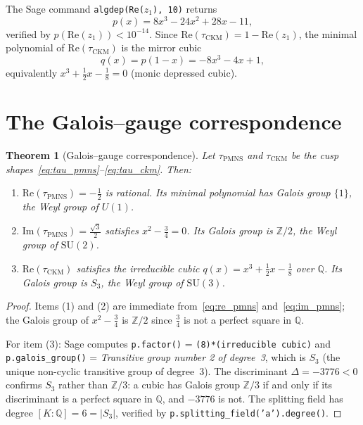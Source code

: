 \documentclass[11pt,a4paper]{article}
\newtheorem{theorem}{Theorem}
\theoremstyle{definition}
\theoremstyle{remark}
\begin{document}
The Sage command \texttt{algdep(Re($z_1$), 10)} returns
\begin{equation}
p(x) = 8x^3-24x^2+28x-11,
\label{eq:cubic}
\end{equation}
verified by $p(\mathrm{Re}(z_1))<10^{-14}$.
Since $\mathrm{Re}(\tau_{\mathrm{CKM}})=1-\mathrm{Re}(z_1)$,
the minimal polynomial of $\mathrm{Re}(\tau_{\mathrm{CKM}})$ is
the mirror cubic
\begin{equation}
q(x) = p(1-x) = -8x^3-4x+1,
\label{eq:mirror}
\end{equation}
equivalently $x^3+\tfrac12 x-\tfrac18=0$ (monic depressed cubic).

\section{The Galois--gauge correspondence}
\label{sec:galois}

\begin{theorem}[Galois--gauge correspondence]
\label{thm:main}
Let $\tau_{\mathrm{PMNS}}$ and $\tau_{\mathrm{CKM}}$ be the cusp
shapes~\eqref{eq:tau_pmns}--\eqref{eq:tau_ckm}.
Then:
\begin{enumerate}
\item $\mathrm{Re}(\tau_{\mathrm{PMNS}})=-\tfrac12$ is rational.
  Its minimal polynomial has Galois group $\{1\}$,
  the Weyl group of $U(1)$.
\item $\mathrm{Im}(\tau_{\mathrm{PMNS}})=\tfrac{\sqrt3}{2}$ satisfies
  $x^2-\tfrac34=0$.
  Its Galois group is $\mathbb{Z}/2$,
  the Weyl group of $\mathrm{SU}(2)$.
\item $\mathrm{Re}(\tau_{\mathrm{CKM}})$ satisfies the irreducible
  cubic $q(x)=x^3+\tfrac12 x-\tfrac18$ over $\mathbb{Q}$.
  Its Galois group is $S_3$,
  the Weyl group of $\mathrm{SU}(3)$.
\end{enumerate}
\end{theorem}

\begin{proof}
Items (1) and (2) are immediate from~\eqref{eq:re_pmns}
and~\eqref{eq:im_pmns}; the Galois group of $x^2-\tfrac34$ is
$\mathbb{Z}/2$ since $\tfrac34$ is not a perfect square in $\mathbb{Q}$.

For item (3): Sage computes \texttt{p.factor()} = \texttt{(8)*(irreducible
  cubic)} and \texttt{p.galois\_group()} = \emph{Transitive group number
  2 of degree~3}, which is $S_3$ (the unique non-cyclic transitive group
of degree~3).
The discriminant $\Delta=-3776<0$ confirms $S_3$ rather than $\mathbb{Z}/3$:
a cubic has Galois group $\mathbb{Z}/3$ if and only if its discriminant
is a perfect square in $\mathbb{Q}$, and $-3776$ is not.
The splitting field has degree $[K:\mathbb{Q}]=6=|S_3|$, verified by
\texttt{p.splitting\_field('a').degree()}.
\end{proof}
\end{document}
